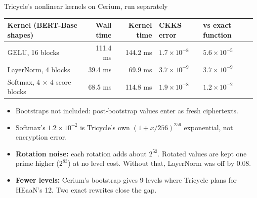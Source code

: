 \documentclass[aspectratio=169]{beamer}
\begin{document}
\begin{frame}{Tricycle's nonlinear kernels on Cerium, run separately}
\small
\begin{center}\footnotesize
\begin{tabular}{@{}lrrll@{}}
\toprule
\textbf{Kernel (BERT-Base shapes)} & \textbf{Wall time} & \textbf{Kernel time} & \textbf{CKKS error} & \textbf{vs exact function}\\
\midrule
GELU, 16 blocks & 111.4 ms & 144.2 ms & $1.7\times10^{-8}$ & $5.6\times10^{-5}$\\
LayerNorm, 4 blocks & 39.4 ms & 69.9 ms & $3.7\times10^{-9}$ & $3.7\times10^{-9}$\\
Softmax, 4 $\times$ 4 score blocks & 68.5 ms & 114.8 ms & $1.9\times10^{-8}$ & $1.2\times10^{-2}$\\
\bottomrule
\end{tabular}
\end{center}
\begin{itemize}\small
  \item Bootstraps not included: post-bootstrap values enter as fresh ciphertexts.
  \item Softmax's $1.2\times10^{-2}$ is Tricycle's own $(1+x/256)^{256}$ exponential, not encryption error.
  \item \textbf{Rotation noise:} each rotation adds about $2^{52}$. Rotated values are kept one prime higher ($2^{83}$) at no level cost. Without that, LayerNorm was off by 0.08.
  \item \textbf{Fewer levels:} Cerium's bootstrap gives 9 levels where Tricycle plans for HEaaN's 12. Two exact rewrites close the gap.
\end{itemize}
\end{frame}
\end{document}
